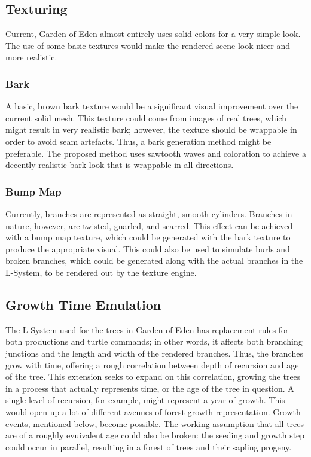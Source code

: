 \documentclass{article}
\newcommand{\tab}{\hspace*{2em}}
\begin{document}
        \subsection{Texturing}
    \tab Current, Garden of Eden almost entirely uses solid colors for a very simple look. The use
of some basic textures would make the rendered scene look nicer and more realistic.

            \subsubsection{Bark}
    \tab A basic, brown bark texture would be a significant visual improvement over the current
solid mesh. This texture could come from images of real trees, which might result in very realistic
bark; however, the texture should be wrappable in order to avoid seam artefacts. Thus, a bark
generation method\cite{bloomenthal85} might be preferable. The proposed method uses sawtooth waves
and coloration to achieve a decently-realistic bark look that is wrappable in all directions.

            \subsubsection{Bump Map}
    \tab Currently, branches are represented as straight, smooth cylinders. Branches in nature,
however, are twisted, gnarled, and scarred. This effect can be achieved with a bump map texture,
which could be generated with the bark texture to produce the appropriate visual. This could also
be used to simulate burls and broken branches, which could be generated along with the actual
branches in the L-System, to be rendered out by the texture engine. 

        \subsection{Growth Time Emulation}
    \tab The L-System used for the trees in Garden of Eden has replacement rules for both
productions and turtle commands; in other words, it affects both branching junctions and the length
and width of the rendered branches. Thus, the branches grow with time, offering a rough correlation
between depth of recursion and age of the tree. This extension seeks to expand on this correlation,
growing the trees in a process that actually represents time, or the age of the tree in question.
A single level of recursion, for example, might represent a year of growth. This would open up a
lot of different avenues of forest growth representation. Growth events, mentioned below, become
possible. The working assumption that all trees are of a roughly evuivalent age could also be
broken: the seeding and growth step could occur in parallel, resulting in a forest of trees and
their sapling progeny.
\end{document}
